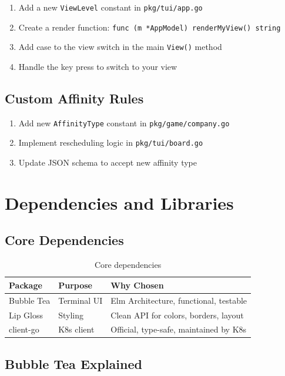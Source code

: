 \documentclass[11pt]{article}
\begin{document}
\begin{enumerate}
    \item Add a new \texttt{ViewLevel} constant in \texttt{pkg/tui/app.go}
    \item Create a render function: \texttt{func (m *AppModel) renderMyView() string}
    \item Add case to the view switch in the main \texttt{View()} method
    \item Handle the key press to switch to your view
\end{enumerate}

\subsection{Custom Affinity Rules}

\begin{enumerate}
    \item Add new \texttt{AffinityType} constant in \texttt{pkg/game/company.go}
    \item Implement rescheduling logic in \texttt{pkg/tui/board.go}
    \item Update JSON schema to accept new affinity type
\end{enumerate}


\section{Dependencies and Libraries}


\subsection{Core Dependencies}

\begin{table}[H]
\centering
\begin{tabular}{@{}lll@{}}
\toprule
\textbf{Package} & \textbf{Purpose} & \textbf{Why Chosen} \\
\midrule
Bubble Tea & Terminal UI & Elm Architecture, functional, testable \\
Lip Gloss & Styling & Clean API for colors, borders, layout \\
client-go & K8s client & Official, type-safe, maintained by K8s \\
\bottomrule
\end{tabular}
\caption{Core dependencies}
\label{tab:deps}
\end{table}

\subsection{Bubble Tea Explained}
\end{document}
